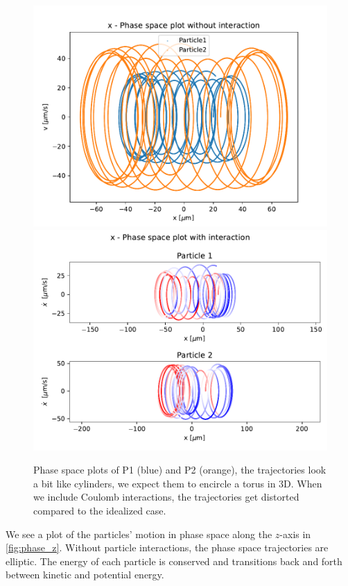 \begin{figure}
\centering
\includegraphics[scale = 0.7]{../figures/x_phase_noint.pdf}
\includegraphics[scale = 0.7]{../figures/x_phase_int.pdf}
\caption{Phase space plots of P1 (blue) and P2 (orange), the trajectories look a bit like cylinders,
we expect them to encircle a torus in 3D.
When we include Coulomb interactions, the trajectories get distorted compared to the idealized case.}
\label{fig:phase_x}
\end{figure}


We see a plot of the particles' motion in phase space along the $z$-axis in \autoref{fig:phase_z}. Without particle interactions, the phase space trajectories are
elliptic. The energy of each particle is conserved and transitions back and forth
between kinetic and potential energy.

